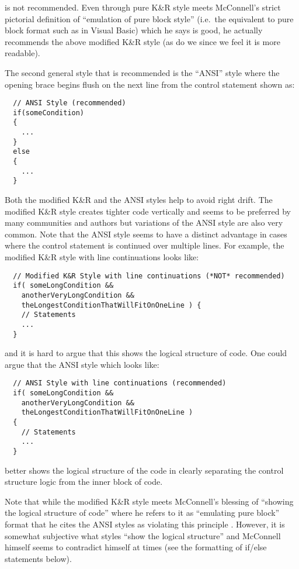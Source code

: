 \begin{enumerate}
is not recommended.  Even through pure K\&R style meets McConnell's strict
pictorial definition of ``emulation of pure block style'' (i.e.\ the
equivalent to pure block format such as in Visual Basic) which he says is
good, he actually recommends the above modified K\&R style (as do we since we
feel it is more readable).

The second general style that is recommended is the ``ANSI''
style{}\cite{ArtisticStyle} where the opening brace begins flush on the next
line from the control statement shown as:

{\small\begin{verbatim}
  // ANSI Style (recommended)
  if(someCondition)
  {
    ...
  }
  else
  {
    ...
  }
\end{verbatim}}

Both the modified K\&R and the ANSI styles help to avoid right drift.  The
modified K\&R style creates tighter code vertically and seems to be preferred
by many communities and authors but variations of the ANSI style are also very
common.  Note that the ANSI style seems to have a distinct advantage in cases
where the control statement is continued over multiple lines.  For example,
the modified K\&R style with line continuations looks like:

{\small\begin{verbatim}
  // Modified K&R Style with line continuations (*NOT* recommended)
  if( someLongCondition &&
    anotherVeryLongCondition &&
    theLongestConditionThatWillFitOnOneLine ) {
    // Statements
    ...
  }
\end{verbatim}}

{}\noindent{}and it is hard to argue that this shows the logical structure of
code.  One could argue that the ANSI style which looks like:

{\small\begin{verbatim}
  // ANSI Style with line continuations (recommended)
  if( someLongCondition &&
    anotherVeryLongCondition &&
    theLongestConditionThatWillFitOnOneLine )
  {
    // Statements
    ...
  }
\end{verbatim}}

better shows the logical structure of the code in clearly separating the
control structure logic from the inner block of code.

Note that while the modified K\&R style meets McConnell's blessing of
``showing the logical structure of code'' where he refers to it as ``emulating
pure block'' format that he cites the ANSI styles as violating this principle
{}\cite[Section 31.1]{CodeComplete2nd04}.  However, it is somewhat subjective
what styles ``show the logical structure'' and McConnell himself seems to
contradict himself at times (see the formatting of if/else statements below).


\end{enumerate}

